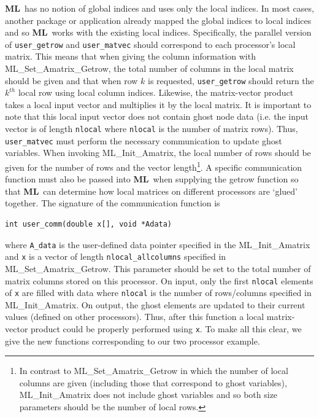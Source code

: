 \documentclass{article}[11pt]
\newcommand{\ML}     {{\bf ML}}
\begin{document}
\ML\ has no notion of global indices and uses only the local indices.
In most cases, another package or application already mapped
the global indices to local indices and so 
\ML\ works with the existing local
indices.  Specifically, the parallel version of 
{\tt user\_getrow} and {\tt user\_matvec} should correspond
to each processor's local matrix.  This means that when giving
the column information with {\sf ML\_Set\_Amatrix\_Getrow}, the
total number of columns in the local matrix should be given and that
when row $k$ is requested, {\tt user\_getrow} should return the $k^{th}$ local
row using local column indices. Likewise, the matrix-vector product
takes a local input vector and multiplies it by the local
matrix. It is important to note that this local input vector
does not contain ghost node data
(i.e. the input vector is of length {\tt nlocal} where {\tt nlocal} is the number of matrix rows). 
Thus, 
{\tt user\_matvec} must perform the necessary communication to update
ghost variables.  When invoking {\sf ML\_Init\_Amatrix}, the local number of rows 
should be given for the number of rows and the vector 
length\footnote{ In contrast to {\sf ML\_Set\_Amatrix\_Getrow} in which the number of
local columns are given (including those that correspond to ghost variables), 
{\sf ML\_Init\_Amatrix} does not include ghost variables and so both size parameters
should be the number of local rows.}.
A specific communication
function must also be passed into \ML\ when supplying the getrow function
so that \ML\ can determine how local 
matrices on different processors are `glued' together.
The signature of the communication function is
%
\begin{verbatim}
int user_comm(double x[], void *Adata) 
\end{verbatim}
%
where {\tt A\_data} is the user-defined data pointer specified in the
{\sf ML\_Init\_Amatrix} and {\tt x} is a vector of length 
{\tt nlocal\_allcolumns} specified in {\sf ML\_Set\_Amatrix\_Getrow}. This parameter
should be set to the total number of matrix columns stored on this processor.
On input, only the first {\tt nlocal} elements of {\tt x} are
filled with data where {\tt nlocal} is the number of rows/columns specified
in {\sf ML\_Init\_Amatrix}. On output, the ghost elements 
are updated to their current values (defined on other processors). Thus, after 
this function a local matrix-vector product could be properly performed
using {\tt x}. To make all this clear, we give the new functions 
corresponding to our two processor example.
\end{document}

